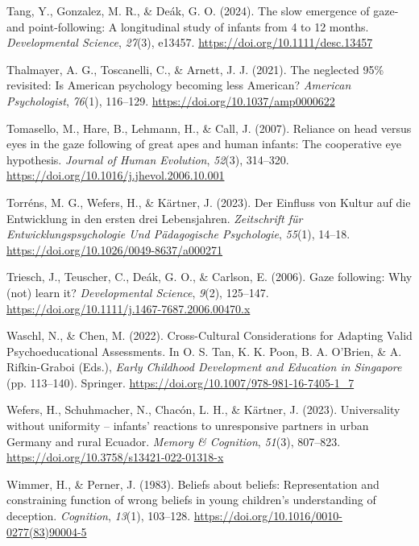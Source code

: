 \documentclass[
  man,floatsintext]{apa7}
\newlength{\cslhangindent}
\newenvironment{CSLReferences}[2] %
 {\begin{list}{}{%
  \setlength{\itemindent}{0pt}
  \setlength{\leftmargin}{0pt}
  \setlength{\parsep}{0pt}
  \ifodd #1
   \setlength{\leftmargin}{\cslhangindent}
   \setlength{\itemindent}{-1\cslhangindent}
  \fi
  \setlength{\itemsep}{#2\baselineskip}}}
 {\end{list}}
\begin{document}
\begin{CSLReferences}{1}{0}
Tang, Y., Gonzalez, M. R., \& Deák, G. O. (2024). The slow emergence of gaze- and point-following: {A} longitudinal study of infants from 4 to 12 months. \emph{Developmental Science}, \emph{27}(3), e13457. \url{https://doi.org/10.1111/desc.13457}

Thalmayer, A. G., Toscanelli, C., \& Arnett, J. J. (2021). The neglected 95\% revisited: {Is American} psychology becoming less {American}? \emph{American Psychologist}, \emph{76}(1), 116--129. \url{https://doi.org/10.1037/amp0000622}

Tomasello, M., Hare, B., Lehmann, H., \& Call, J. (2007). Reliance on head versus eyes in the gaze following of great apes and human infants: The cooperative eye hypothesis. \emph{Journal of Human Evolution}, \emph{52}(3), 314--320. \url{https://doi.org/10.1016/j.jhevol.2006.10.001}

Torréns, M. G., Wefers, H., \& Kärtner, J. (2023). Der {Einfluss} von {Kultur} auf die {Entwicklung} in den ersten drei {Lebensjahren}. \emph{Zeitschrift f{ü}r Entwicklungspsychologie Und P{ä}dagogische Psychologie}, \emph{55}(1), 14--18. \url{https://doi.org/10.1026/0049-8637/a000271}

Triesch, J., Teuscher, C., Deák, G. O., \& Carlson, E. (2006). Gaze following: Why (not) learn it? \emph{Developmental Science}, \emph{9}(2), 125--147. \url{https://doi.org/10.1111/j.1467-7687.2006.00470.x}

Waschl, N., \& Chen, M. (2022). Cross-{Cultural Considerations} for {Adapting Valid Psychoeducational Assessments}. In O. S. Tan, K. K. Poon, B. A. O'Brien, \& A. Rifkin-Graboi (Eds.), \emph{Early {Childhood Development} and {Education} in {Singapore}} (pp. 113--140). Springer. \url{https://doi.org/10.1007/978-981-16-7405-1_7}

Wefers, H., Schuhmacher, N., Chacón, L. H., \& Kärtner, J. (2023). Universality without uniformity -- infants' reactions to unresponsive partners in urban {Germany} and rural {Ecuador}. \emph{Memory \& Cognition}, \emph{51}(3), 807--823. \url{https://doi.org/10.3758/s13421-022-01318-x}

Wimmer, H., \& Perner, J. (1983). Beliefs about beliefs: {Representation} and constraining function of wrong beliefs in young children's understanding of deception. \emph{Cognition}, \emph{13}(1), 103--128. \url{https://doi.org/10.1016/0010-0277(83)90004-5}


\end{CSLReferences}
\end{document}
